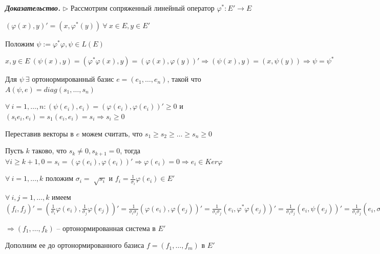 \vspace{\baselineskip}
\textbf{\textit{Доказательство.}} $\rhd$ Рассмотрим сопряженный линейный оператор $\varphi^*: E' \rightarrow E$

$(\varphi(x), y)' = (x, \varphi^*(y)) \ \forall \ x \in E, y \in E'$

\vspace{\baselineskip}
Положим $\psi:= \varphi^* \varphi, \psi \in L(E)$

$x, y \in E \ (\psi(x), y) = (\varphi^* \varphi(x), y) = (\varphi(x), \varphi(y))' \Rightarrow (\psi(x), y) = (x, \psi(y)) \Rightarrow \psi = \psi^*$

\vspace{\baselineskip}
Для $\psi \ \exists$ ортонормированный базис $e = (e_1, \dots, e_n)$, такой что $A(\psi, e) = diag(s_1, \dots, s_n)$

\vspace{\baselineskip}
$\forall \ i = 1, \dots, n: (\psi(e_i), e_i) = (\varphi(e_i), \varphi(e_i))' \geqslant 0$ и $(s_i e_i, e_i) = s_1 (e_i, e_i) = s_i \Rightarrow s_i \geqslant 0$

\vspace{\baselineskip}
Переставив векторы в $e$ можем считать, что $s_1 \geqslant s_2 \geqslant \dots \geqslant s_n \geqslant 0$

\vspace{\baselineskip}
Пусть $k$ таково, что $s_k \neq 0, s_{k+1} = 0$, тогда $\forall i \geqslant k + 1, 0 = s_i = (\varphi(e_i), \varphi(e_i))' \Rightarrow \varphi(e_i) = 0 \Rightarrow e_i \in Ker \varphi$

\vspace{\baselineskip}
$\forall \ i = 1, \dots, k$ положим $\sigma_i = \sqrt[]{s_i}$ и $f_i = \frac{1}{\sigma_i} \varphi(e_i) \in E'$

$\forall \ i, j = 1, \dots, k$ имеем $(f_i, f_j)' = (\frac{1}{\sigma_i} \varphi(e_i), \frac{1}{\sigma_j} \varphi(e_j))' = \frac{1}{\sigma_i \sigma_j}(\varphi(e_i), \varphi(e_j))' = \frac{1}{\sigma_i \sigma_j}(e_i, \varphi^* \varphi(e_j))' = \frac{1}{\sigma_i \sigma_j}(e_i, \psi(e_j))' = \frac{1}{\sigma_i \sigma_j}(e_i, \sigma_j^2 e_j)' = \frac{\sigma_j}{\sigma_i} (e_i, e_j) = \frac{\sigma_j}{\sigma_i} \delta_{ij} = \delta_{ij}$

$\Rightarrow (f_1, \dots, f_k)$ -- ортонормированная система в $E'$

\vspace{\baselineskip}
Дополним ее до ортонормированного базиса $f = (f_1, \dots, f_m)$ в $E'$

